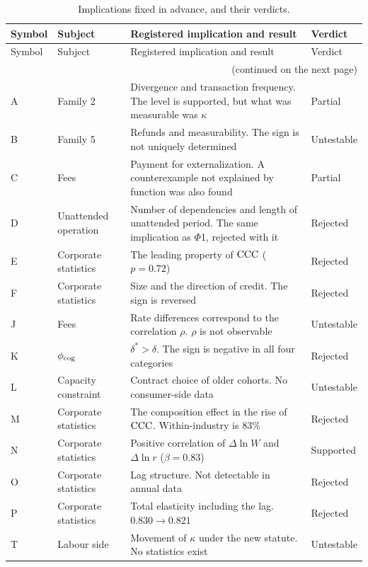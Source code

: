 \begin{longtable}{@{}ll>{\raggedright\arraybackslash}p{}l@{}}
\caption{Implications fixed in advance, and their verdicts.}\label{tab:prereg-list}\\
\toprule
Symbol & Subject & Registered implication and result & Verdict \\
\midrule
\endfirsthead
\toprule
Symbol & Subject & Registered implication and result & Verdict \\
\midrule
\endhead
\midrule
\multicolumn{4}{r}{\footnotesize (continued on the next page)}\\
\endfoot
\bottomrule
\endlastfoot
A & Family 2 & Divergence and transaction frequency. The level is supported, but what was measurable was $\kappa$ & Partial \\
B & Family 5 & Refunds and measurability. The sign is not uniquely determined & Untestable \\
C & Fees & Payment for externalization. A counterexample not explained by function was also found & Partial \\
D & Unattended operation & Number of dependencies and length of unattended period. The same implication as $\Phi$1, rejected with it & Rejected \\
E & Corporate statistics & The leading property of $\mathrm{CCC}$ ($p=0.72$) & Rejected \\
F & Corporate statistics & Size and the direction of credit. The sign is reversed & Rejected \\
J & Fees & Rate differences correspond to the correlation $\rho$. $\rho$ is not observable & Untestable \\
K & $\phi_{\rm cog}$ & $\delta^\ast>\delta$. The sign is negative in all four categories & Rejected \\
L & Capacity constraint & Contract choice of older cohorts. No consumer-side data & Untestable \\
M & Corporate statistics & The composition effect in the rise of $\mathrm{CCC}$. Within-industry is 83\% & Rejected \\
N & Corporate statistics & Positive correlation of $\Delta\ln W$ and $\Delta\ln r$ ($\beta=0.83$) & Supported \\
O & Corporate statistics & Lag structure. Not detectable in annual data & Rejected \\
P & Corporate statistics & Total elasticity including the lag. $0.830\to0.821$ & Rejected \\
T & Labour side & Movement of $\kappa$ under the new statute. No statistics exist & Untestable \\

\end{longtable}
